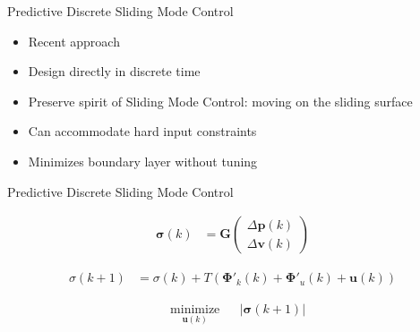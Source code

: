 \documentclass[12pt,svgnames,table,draft=false]{beamer}
\newcommand{\mbf}[1]{\mathbf{#1}}
\providecommand{\mbf}[1]{\mathbf{#1}}
\newcommand{\idxSample}{{\ensuremath{k}}}
\begin{document}
\usebackgroundtemplate{
}

\begin{frame}{Predictive Discrete Sliding Mode Control}
\centering
\begin{tcolorbox}[colback=blue!5!white,colframe=blue!75!black,title=PDSMC]
\begin{itemize}
\item Recent approach \cite{houda2013new}
\item Design directly in discrete time
\item Preserve spirit of Sliding Mode Control: moving on the sliding surface
\item Can accommodate hard input constraints
\item Minimizes boundary layer without tuning
\end{itemize}
\end{tcolorbox}
\end{frame}

\begin{frame}{Predictive Discrete Sliding Mode Control}
\centering
\begin{tcolorbox}[colback=blue!5!white,colframe=blue!75!black,title=What it looks like, width=.8\paperwidth]

\begin{align}
\mbf{\sigma}(\idxSample) &= \mbf{G}
\begin{pmatrix}
\Delta \mbf{p}(\idxSample)\\
\Delta \mbf{v}(\idxSample)
\end{pmatrix} \nonumber
\end{align}

\begin{align}
{{\sigma}}(\idxSample+1)
&=
{{\sigma}}(\idxSample)
+
T(
\mbf{\Phi}'_k(\idxSample) + \mbf{\Phi}'_u(\idxSample) + \mbf{u}(\idxSample))
\nonumber
\end{align}

\begin{align}
& \underset{\mbf{u}(\idxSample)}{\text{minimize}}
& & |\mbf{\sigma}(\idxSample+1)| \nonumber 
\end{align}

\end{tcolorbox}

\end{frame}
\end{document}
